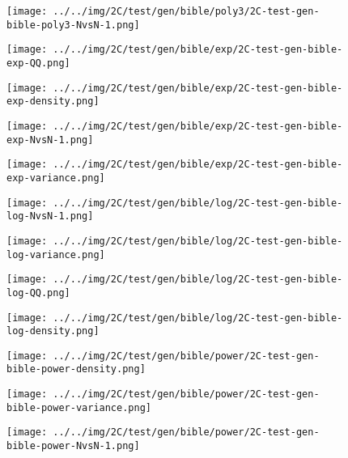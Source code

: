 \begin{figure}[H]
\centering	\texttt{[image: ../../img/2C/test/gen/bible/poly3/2C-test-gen-bible-poly3-NvsN-1.png]}
\end{figure}
\begin{figure}[H]
\centering	\texttt{[image: ../../img/2C/test/gen/bible/exp/2C-test-gen-bible-exp-QQ.png]}
\end{figure}
\begin{figure}[H]
\centering	\texttt{[image: ../../img/2C/test/gen/bible/exp/2C-test-gen-bible-exp-density.png]}
\end{figure}
\begin{figure}[H]
\centering	\texttt{[image: ../../img/2C/test/gen/bible/exp/2C-test-gen-bible-exp-NvsN-1.png]}
\end{figure}
\begin{figure}[H]
\centering	\texttt{[image: ../../img/2C/test/gen/bible/exp/2C-test-gen-bible-exp-variance.png]}
\end{figure}
\begin{figure}[H]
\centering	\texttt{[image: ../../img/2C/test/gen/bible/log/2C-test-gen-bible-log-NvsN-1.png]}
\end{figure}
\begin{figure}[H]
\centering	\texttt{[image: ../../img/2C/test/gen/bible/log/2C-test-gen-bible-log-variance.png]}
\end{figure}
\begin{figure}[H]
\centering	\texttt{[image: ../../img/2C/test/gen/bible/log/2C-test-gen-bible-log-QQ.png]}
\end{figure}
\begin{figure}[H]
\centering	\texttt{[image: ../../img/2C/test/gen/bible/log/2C-test-gen-bible-log-density.png]}
\end{figure}
\begin{figure}[H]
\centering	\texttt{[image: ../../img/2C/test/gen/bible/power/2C-test-gen-bible-power-density.png]}
\end{figure}
\begin{figure}[H]
\centering	\texttt{[image: ../../img/2C/test/gen/bible/power/2C-test-gen-bible-power-variance.png]}
\end{figure}
\begin{figure}[H]
\centering	\texttt{[image: ../../img/2C/test/gen/bible/power/2C-test-gen-bible-power-NvsN-1.png]}
\end{figure}
